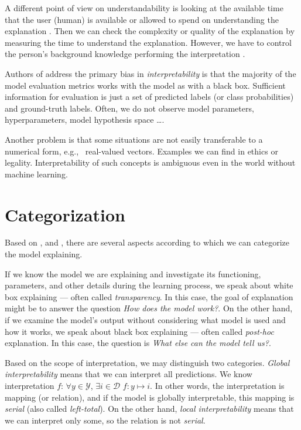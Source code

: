 A different point of view on understandability is looking at the available time that the user (human) is available or allowed to spend on understanding the explanation \cite{Guidotti2018}. Then we can check the complexity or quality of the explanation by measuring the time to understand the explanation. However, we have to control the person's background knowledge performing the interpretation \cite{Guidotti2018}.

Authors of \cite{Montavon2018} address the primary bias in \emph{interpretability} is that the majority of the model evaluation metrics works with the model as with a black box. Sufficient information for evaluation is just a set of predicted labels (or class probabilities) and ground-truth labels. Often, we do not observe model parameters, hyperparameters, model hypothesis space \dots. 

Another problem is that some situations are not easily transferable to a numerical form, e.g., \ real-valued vectors. Examples we can find in ethics or legality. Interpretability of such concepts is ambiguous even in the world without machine learning.

\section{Categorization}
Based on \cite{Guidotti2018}, and \cite{Lipton2016}, there are several aspects according to which we can categorize the model explaining.

If we know the model we are explaining and investigate its functioning, parameters, and other details during the learning process, we speak about white box explaining --- often called \emph{transparency}. In this case, the goal of explanation might be to answer the question \emph{How does the model work?}. On the other hand, if we examine the model's output without considering what model is used and how it works, we speak about black box explaining --- often called \emph{post-hoc} explanation. In this case, the question is \emph{What else can the model tell us?}.

Based on the scope of interpretation, we may distinguish two categories. \emph{Global interpretability} means that we can interpret all predictions. We know interpretation $f$: $\forall y \in \mathcal{Y}$, $\exists i \in \mathcal{D}$ $f: y\mapsto i$. In other words, the interpretation is mapping (or relation), and if the model is globally interpretable, this mapping is \emph{serial} (also called \emph{left-total}). On the other hand, \emph{local interpretability} means that we can interpret only some, so the relation is not \emph{serial}.


